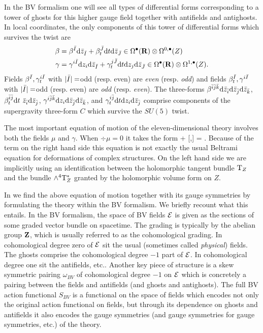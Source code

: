 \documentclass[../main.tex]{subfiles}
\begin{document}
In the BV formalism one will see all types of differential forms corresponding to a tower of ghosts for this higher gauge field together with antifields and antighosts.
In local coordinates, the only components of this tower of differential forms which survives the twist are
\begin{align*}
\beta & = \beta^{\Bar{I}} \mathrm{d} \bar{z}_{\Bar{I}} + \beta_t^{\Bar{J}} \mathrm{d} t \mathrm{d} \bar{z}_{\Bar{J}} \in \Omega^{\bullet}(\mathbf{R}) \otimes \Omega^{0,\bullet}(Z) \\
\gamma & = \gamma^{i \Bar{I}} \mathrm{d} z_i \mathrm{d} \bar{z}_{\Bar{I}} + \gamma_t^{j \Bar{J}} \mathrm{d} t \mathrm{d} z_j \mathrm{d} \bar{z}_{\Bar{J}} \in \Omega^{\bullet} (\mathbf{R}) \otimes \Omega^{1,\bullet}(Z).
\end{align*}
Fields $\beta^{\Bar{I}}, \gamma_t^{i \Bar{I}}$ with $|\Bar{I}| = $odd (resp. even) are {\em even} (resp. {\em odd}) and fields $\beta_t^{\Bar{I}}, \gamma^{i \Bar{I}}$ with $|\Bar{I}| = $odd (resp. even) are {\em odd} (resp. {\em even}). 
The three-forms $\beta^{\Bar{i}\Bar{j}\Bar{k}} \mathrm{d} \bar{z}_{\Bar{i}} \mathrm{d} \bar{z}_{\Bar{j}} \mathrm{d} \bar{z}_{\Bar{k}}$, $\beta_t^{\Bar{i}\Bar{j}} \mathrm{d} t \ \bar{z}_{\Bar{i}} \mathrm{d} \bar{z}_{\Bar{j}}$, $\gamma^{i \Bar{j} \Bar{k}} \mathrm{d} z_i \mathrm{d} \bar{z}_{\Bar{j}} \mathrm{d} \bar{z}_{\Bar{k}}$, and $\gamma_t^{i \Bar{j}} \mathrm{d} t \mathrm{d} z_i \mathrm{d} \bar{z}_{\Bar{j}}$ comprise components of the supergravity three-form $C$ which survive the $SU(5)$ twist. 

The most important equation of motion of the eleven-dimensional theory involves both the fields $\mu$ and $\gamma$. 
When $\div \mu = 0$ it takes the form
\beqn\label{eqn:eom2}
\dbar \mu +  [\mu,\mu] = \del \gamma \del \gamma .
\eeqn
Because of the term on the right hand side this equation is not exactly the usual Beltrami equation for deformations of complex structures.
On the left hand side we are implicitly using an identification between the holomorphic tangent bundle ${\mathrm{T}}_Z$ and the bundle $\wedge^4 {\mathrm{T}}^*_Z$ granted by the holomorphic volume form on $Z$.

In \cite{RSW} we find the above equation of motion together with its gauge symmetries by formulating the theory within the BV formalism.
We briefly recount what this entails.
In the BV formalism, the space of BV fields $\mathcal E$ is given as the sections of some graded vector bundle on spacetime. 
The grading is typically by the abelian group $\mathbf{Z}$, which is usually referred to as the cohomological grading.
In cohomological degree zero of $\mathcal E$ sit the usual (sometimes called {\em physical}) fields.
The ghosts comprise the cohomological degree $-1$ part of $\mathcal E$. 
In cohomological degree one sit the antifields, etc..
Another key piece of structure is a skew symmetric pairing $\omega_{BV}$ of cohomological degree $-1$ on $\mathcal E$ which is concretely a pairing between the fields and antifields (and ghosts and antighosts).
The full BV action functional $S_{BV}$ is a functional on the space of fields which encodes not only the original action functional on fields, but through its dependence on ghosts and antifields it also encodes the gauge symmetries (and gauge symmetries for gauge symmetries, etc.) of the theory. 
\end{document}
